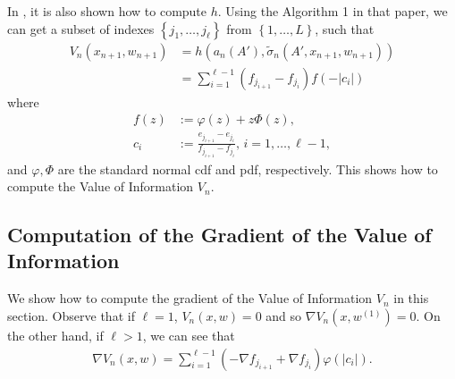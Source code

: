 \documentclass{article}
\newcommand{\w}{w}
\newcommand{\sigmatilde}{\tilde{\sigma}}
\begin{document}
In \cite{frazier2009knowledge}, it is also shown how to compute $h$. Using the Algorithm 1 in that paper, we can get a subset of indexes
$\left\{ j_{1},\ldots,j_{\ell}\right\}$ from $\left\{ 1,\ldots,L\right\}$, such that %
\begin{align*}
V_n(x_{n+1},\w_{n+1})
&=h(a_n(A'),\sigmatilde_n(A',x_{n+1},\w_{n+1}))\\
&=\sum_{i=1}^{\ell-1}\left(f_{j_{i+1}}-f_{j_{i}}\right)f\left(-\left|c_{i}\right|\right)
\end{align*}
where
\begin{align*}
f\left(z\right) & := \varphi\left(z\right)+z\Phi\left(z\right),\\
c_{i} & :=  \frac{e_{j_{i+1}}-e_{j_{i}}}{f_{j_{i+1}}-f_{j_{i}}}\mbox{, }i=1,\ldots,\ell-1,
\end{align*}
and $\varphi,\Phi$ are the standard normal cdf and pdf, respectively. This shows how to compute the Value of Information
$V_n$.

\subsection{Computation of the Gradient of the Value of Information} 

We show how to compute the gradient of the Value of Information $V_n$ in this section. Observe that if $\ell=1$, $V_{n}\left(x,\w\right)=0$
and so $\nabla V_{n}\left(x,\w^{\left(1\right)}\right)=0$. On
the other hand, if $\ell>1$, we can see that
\begin{align*}
\nabla V_{n}\left(x,\w\right) = \sum_{i=1}^{\ell-1}\left(-\nabla f_{j_{i+1}}+\nabla f_{j_{i}}\right)\varphi\left(\left|c_{i}\right|\right).
\end{align*}
\end{document}
